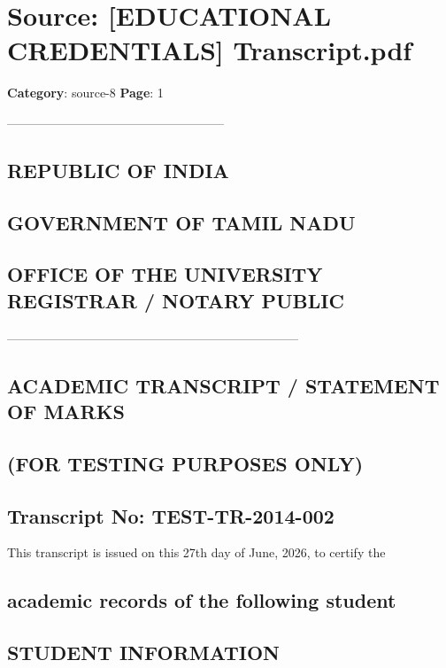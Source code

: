 \section*{Source: [EDUCATIONAL CREDENTIALS] Transcript.pdf}
\textbf{Category}: source-8
\textbf{Page}: 1

-----------------------------------------------------

\subsection*{REPUBLIC OF INDIA}

\subsection*{GOVERNMENT OF TAMIL NADU}

\subsection*{OFFICE OF THE UNIVERSITY REGISTRAR / NOTARY PUBLIC}

-----------------------------------------------------------------------

\subsection*{ACADEMIC TRANSCRIPT / STATEMENT OF MARKS}

\subsection*{(FOR TESTING PURPOSES ONLY)}

\subsection*{Transcript No: TEST-TR-2014-002}

This transcript is issued on this 27th day of June, 2026, to certify the

\subsection*{academic records of the following student}

\subsection*{STUDENT INFORMATION}

